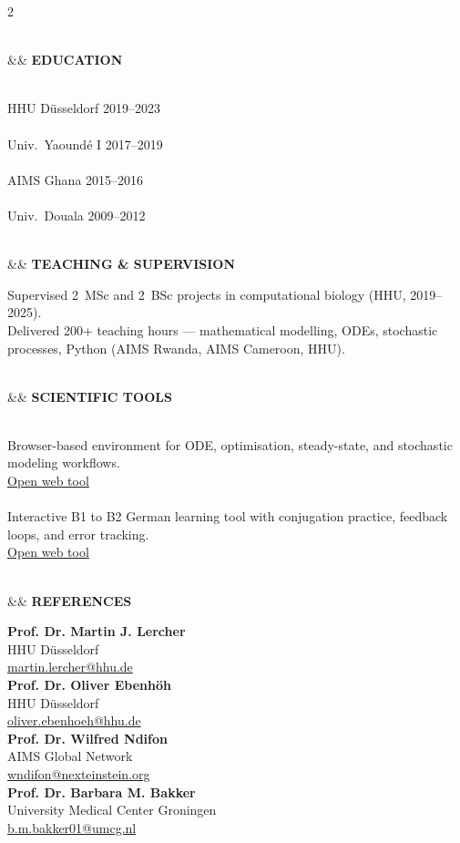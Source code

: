 \documentclass[10pt,a4paper]{article}
\newlength{\secbefore}   \setlength{\secbefore}{4.5pt}
\newlength{\secafter}    \setlength{\secafter}{2.5pt}
\newlength{\sidesecbefore}\setlength{\sidesecbefore}{3.8pt}
\newcommand{\sidecvsection}[2][]{%
    \vspace{\sidesecbefore}%
    \noindent{\color{teal}\rule{\linewidth}{1.0pt}}\\[-2pt]%
    \noindent%
    \ifx&#1&\else{\footnotesize\color{teal}#1\enspace}\fi%
    {\footnotesize\bfseries\color{ink}\MakeUppercase{#2}}%
    \par\vspace{\secafter}%
}
\begin{document}
\begin{paracol}{2}
\begin{leftcolumn}
\sidecvsection[\faGraduationCap]{Education}

{\footnotesize\justifying
{}\\
{\color{muted}HHU D\"usseldorf \hfill 2019--2023}\\[1.5pt]
\\
{\color{muted}Univ.\ Yaound\'e I \hfill 2017--2019}\\[1.5pt]
\\
{\color{muted}AIMS Ghana \hfill 2015--2016}\\[1.5pt]
\\
{\color{muted}Univ.\ Douala \hfill 2009--2012}}

\sidecvsection[\faPencil]{Teaching \& Supervision}

{\footnotesize\justifying\color{muted}
Supervised 2~MSc and 2~BSc projects in computational biology (HHU, 2019--2025).\\[2pt]
Delivered 200+ teaching hours --- mathematical modelling, ODEs, stochastic processes, Python (AIMS Rwanda, AIMS Cameroon, HHU).}

\sidecvsection[\faLaptop]{Scientific Tools}
{\footnotesize\justifying
{}\\
{\color{muted}Browser-based environment for ODE, optimisation, steady-state, and stochastic modeling workflows.}\\[1pt]
{\color{teal}\faExternalLink\enspace\href{https://chilperic.github.io/chilperic_ode_solver/}{Open web tool}}\\[3pt]
\\
{\color{muted}Interactive B1 to B2 German learning tool with conjugation practice, feedback loops, and error tracking.}\\[1pt]
{\color{teal}\faExternalLink\enspace\href{https://chilperic.github.io/Deutsch-wipa-2026/}{Open web tool}}}

\sidecvsection[\faUsers]{References}
{\footnotesize
\textbf{Prof. Dr. Martin J. Lercher}\\
{\color{muted}HHU D\"usseldorf}\\
\href{mailto:martin.lercher@hhu.de}{martin.lercher@hhu.de}\\[3pt]
\textbf{Prof. Dr. Oliver Ebenh\"oh}\\
{\color{muted}HHU D\"usseldorf}\\
\href{mailto:oliver.ebenhoeh@hhu.de}{oliver.ebenhoeh@hhu.de}\\[3pt]
\textbf{Prof. Dr. Wilfred Ndifon}\\
{\color{muted}AIMS Global Network}\\
\href{mailto:wndifon@nexteinstein.org}{wndifon@nexteinstein.org}\\[3pt]
\textbf{Prof. Dr. Barbara M. Bakker}\\
{\color{muted}University Medical Center Groningen}\\
\href{mailto:b.m.bakker01@umcg.nl}{b.m.bakker01@umcg.nl}}


\end{leftcolumn}
\end{paracol}
\end{document}
